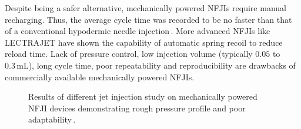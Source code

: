         Despite being a safer alternative, mechanically powered \acsp{NFJI} require manual recharging. Thus, the average cycle time was recorded to be no faster than that of a conventional hypodermic needle injection\,\cite{PharmaJet2011}. More advanced \acsp{NFJI} like LECTRAJET  have shown the capability of automatic spring recoil to reduce reload time. Lack of pressure control, low injection volume (typically $0.05$ to $0.3\,\mathrm{mL}$), long cycle time, poor repeatability and reproducibility are drawbacks of commercially available mechanically powered \acsp{NFJI}.
        
        \begin{figure}[!ht]
            \centering
            \qquad
            \caption[Results of different jet injection study on mechanically powered \acs{NFJI} devices demonstrating rough pressure profile and poor adaptability.]{
                Results of different jet injection study on mechanically powered \acs{NFJI} devices demonstrating rough pressure profile and poor adaptability\,\cite{schramm2002}.
            }   \label{fig:chapter/background/jet injection effectiveness}
        \end{figure}



